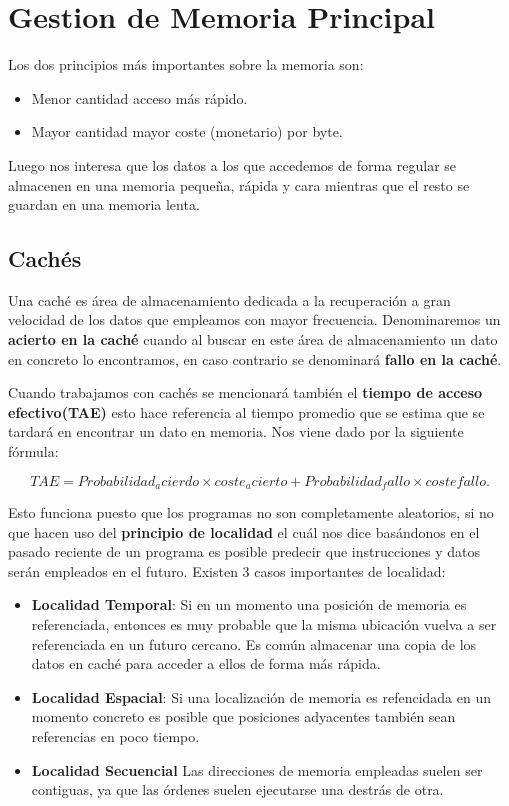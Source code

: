 \section*{Gestion de Memoria Principal}

Los dos principios más importantes sobre la memoria son:

\begin{itemize}
	\item Menor cantidad acceso más rápido.
	\item Mayor cantidad mayor coste (monetario) por byte.
\end{itemize}

Luego nos interesa que los datos a los que accedemos de forma regular se almacenen en una memoria pequeña, rápida y cara mientras que el resto se guardan en una memoria lenta.


\subsection*{Cachés}
Una caché es área de almacenamiento dedicada a la recuperación a gran velocidad de los datos que empleamos con mayor frecuencia. Denominaremos un \textbf{acierto en la caché} cuando al buscar en este área de almacenamiento un dato en concreto lo encontramos, en caso contrario se denominará \textbf{fallo en la caché}.

Cuando trabajamos con cachés se mencionará también el \textbf{tiempo de acceso efectivo(TAE)} esto hace referencia al tiempo promedio que se estima que se tardará en encontrar un dato en memoria. Nos viene dado por la siguiente fórmula:

\[
TAE = Probabilidad_acierdo\times coste_acierto + Probabilidad_fallo\times coste fallo.
\]

Esto funciona puesto que los programas no son completamente aleatorios, si no que hacen uso del \textbf{principio de localidad} el cuál nos dice basándonos en el pasado reciente de un programa es posible predecir que instrucciones y datos serán empleados en el futuro. Existen 3 casos importantes de localidad:

\begin{itemize}
	\item \textbf{Localidad Temporal}: Si en un momento una posición de memoria es referenciada, entonces es muy probable que la misma ubicación vuelva a ser referenciada en un futuro cercano. Es común almacenar una copia de los datos en caché para acceder a ellos de forma más rápida.
	\item \textbf{Localidad Espacial}: Si una localización de memoria es refencidada en un momento concreto es posible que posiciones adyacentes también sean referencias en poco tiempo.
	\item \textbf{Localidad Secuencial} Las direcciones de memoria empleadas suelen ser contiguas, ya que las órdenes suelen ejecutarse una destrás de otra.
\end{itemize}

